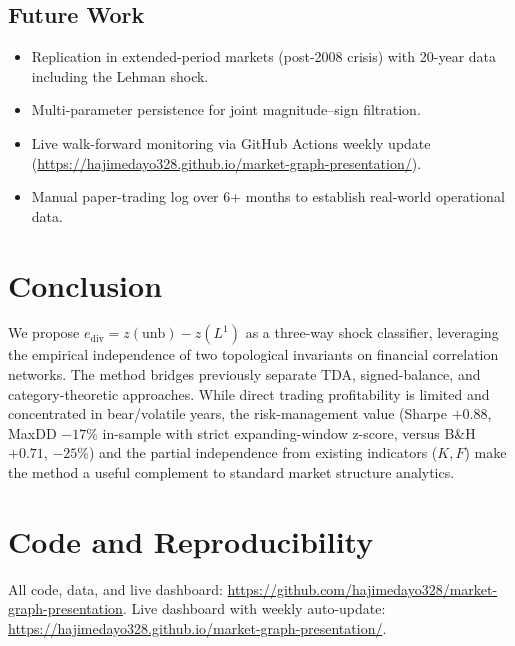 \documentclass[11pt]{article}
\begin{document}
\subsection{Future Work}

\begin{itemize}
  \item Replication in extended-period markets (post-2008 crisis) with 20-year
        data including the Lehman shock.
  \item Multi-parameter persistence for joint magnitude--sign filtration.
  \item Live walk-forward monitoring via GitHub Actions weekly update
        (\url{https://hajimedayo328.github.io/market-graph-presentation/}).
  \item Manual paper-trading log over 6+ months to establish real-world
        operational data.
\end{itemize}

\section{Conclusion}

We propose $e_{\mathrm{div}} = z(\text{unb}) - z(L^1)$ as a three-way shock
classifier, leveraging the empirical independence of two topological invariants
on financial correlation networks. The method bridges previously separate TDA,
signed-balance, and category-theoretic approaches. While direct trading
profitability is limited and concentrated in bear/volatile years, the
risk-management value (Sharpe $+0.88$, MaxDD $-17\%$ in-sample with strict
expanding-window z-score, versus B\&H $+0.71$, $-25\%$) and the partial
independence from existing indicators
($K, F$) make the method a useful complement to standard market structure
analytics.

\section*{Code and Reproducibility}

All code, data, and live dashboard:
\url{https://github.com/hajimedayo328/market-graph-presentation}.
Live dashboard with weekly auto-update:
\url{https://hajimedayo328.github.io/market-graph-presentation/}.



\end{document}
